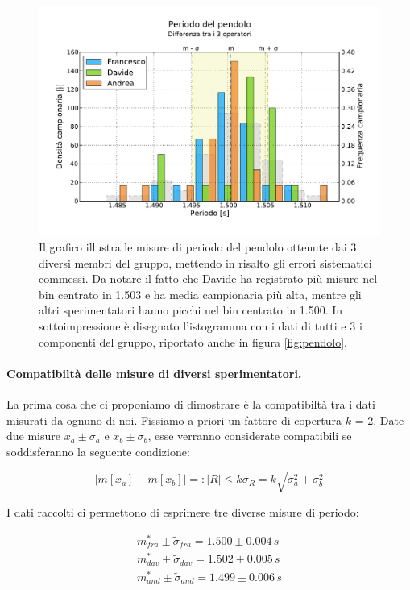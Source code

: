 \begin{figure}[bt]
	\centering
	\includegraphics[width=150mm]{grafici/pendolo3.pdf}
	\caption{Il grafico illustra le misure di periodo del pendolo ottenute
        dai 3 diversi membri del gruppo, mettendo in risalto gli errori
        sistematici commessi. Da notare il fatto che Davide ha registrato più
        misure nel bin centrato in 1.503 e ha media campionaria più alta, mentre gli
        altri sperimentatori hanno picchi nel bin centrato in 1.500. In sottoimpressione
        è disegnato l'istogramma con i dati di tutti e 3 i componenti del gruppo, riportato
        anche in figura \ref{fig:pendolo}.}
    \label{fig:pendolo3}
\end{figure}

\paragraph{Compatibiltà delle misure di diversi sperimentatori.}

La prima cosa che ci proponiamo di dimostrare è la compatibiltà
tra i dati misurati da ognuno di noi. Fissiamo a priori un fattore
di copertura $k$ = 2. Date due misure $x_a \pm \sigma_a$ e $x_b \pm \sigma_b$,
esse verranno considerate compatibili se soddisferanno la seguente condizione:

\begin{equation}
    |m[x_a] - m[x_b]| =: |R| \leq k\sigma_R = k\sqrt{\sigma_a^2 + \sigma_b^2}
\end{equation}

I dati raccolti ci permettono di esprimere tre diverse misure di periodo:

\begin{equation*}
	\begin{split}
		m_{fra}^* \pm \tilde{\sigma}_{fra}  = 1.500 \pm 0.004\,s \\
		m_{dav}^* \pm \tilde{\sigma}_{dav} = 1.502 \pm 0.005\,s \\
		m_{and}^* \pm \tilde{\sigma}_{and} = 1.499 \pm 0.006\,s
	\end{split}
\end{equation*}

